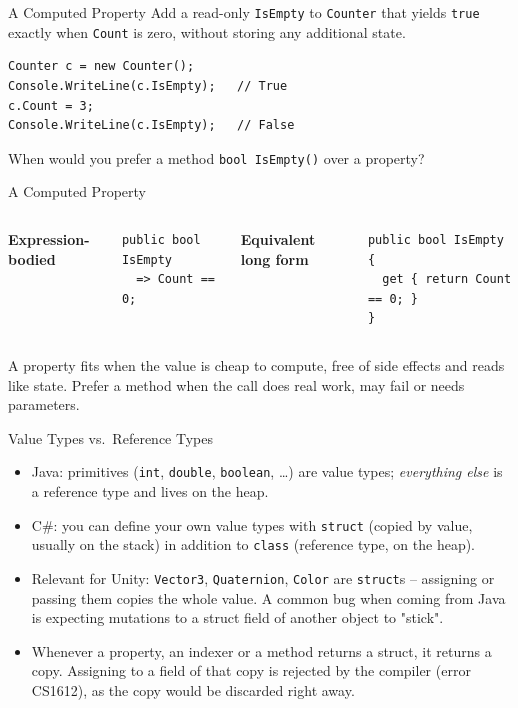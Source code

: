 \begin{exerciseframe}{A Computed Property}
  Add a read-only \texttt{IsEmpty} to \texttt{Counter} that yields
  \texttt{true} exactly when \texttt{Count} is zero, without storing any
  additional state.
  \begin{lstlisting}
Counter c = new Counter();
Console.WriteLine(c.IsEmpty);   // True
c.Count = 3;
Console.WriteLine(c.IsEmpty);   // False
  \end{lstlisting}
  When would you prefer a method \texttt{bool IsEmpty()} over a property?
\end{exerciseframe}

\begin{solutionframe}{A Computed Property}
  \begin{columns}[T]
      \textbf{Expression-bodied}
      \begin{lstlisting}
public bool IsEmpty
  => Count == 0;
      \end{lstlisting}
      \textbf{Equivalent long form}
      \begin{lstlisting}
public bool IsEmpty
{
  get { return Count == 0; }
}
      \end{lstlisting}
  \end{columns}
  A property fits when the value is cheap to compute, free of side effects and
  reads like state. Prefer a method when the call does real work, may fail or
  needs parameters.
  \vspace{3ex}

\end{solutionframe}

\begin{frame}{Value Types vs.\ Reference Types}
  \begin{itemize}
    \item Java: primitives (\texttt{int}, \texttt{double}, \texttt{boolean},
      \ldots) are value types; \emph{everything else} is a reference type
      and lives on the heap.
    \item C\#: you can define your own value types with \texttt{struct}
      (copied by value, usually on the stack) in addition to
      \texttt{class} (reference type, on the heap).
    \item Relevant for Unity: \texttt{Vector3}, \texttt{Quaternion},
      \texttt{Color} are \texttt{struct}s -- assigning or passing them
      copies the whole value. A common bug when coming from Java is
      expecting mutations to a struct field of another object to
      "stick".
    \item Whenever a property, an indexer or a method returns a struct, it
      returns a copy. Assigning to a field of that copy is rejected by the
      compiler (error CS1612), as the copy would be discarded right away.
  \end{itemize}
\end{frame}

